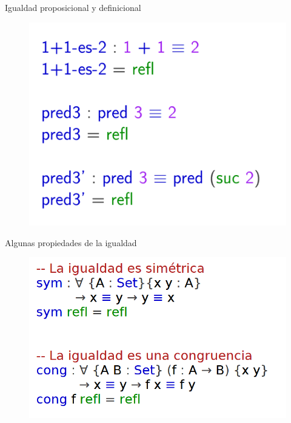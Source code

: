 \documentclass[11pt]{beamer}
\begin{document}
\begin{frame}{Igualdad proposicional y definicional}
\begin{figure}
\includegraphics[scale=0.7]{img/propeq}
\end{figure}
\end{frame}



\begin{frame}{Algunas propiedades de la igualdad}
\begin{figure}
\includegraphics[scale=0.9]{img/congsym}
\end{figure}
\end{frame}
\end{document}
